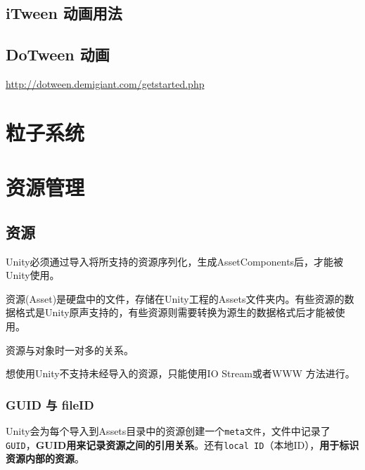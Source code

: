 \documentclass[UTF8,a4paper,12pt]{ctexbook}
\begin{document}
	\section{iTween 动画用法}
		
	
	\section{DoTween 动画}
		\url{http://dotween.demigiant.com/getstarted.php}
	
	
	
\chapter{粒子系统}

		

				
				
\chapter{资源管理}
	\section{资源}
		Unity必须通过导入将所支持的资源序列化，生成AssetComponents后，才能被Unity使用。
		
		资源(Asset)是硬盘中的文件，存储在Unity工程的Assets文件夹内。有些资源的数据格式是Unity原声支持的，有些资源则需要转换为源生的数据格式后才能被使用。
	
		资源与对象时一对多的关系。
		
		想使用Unity不支持未经导入的资源，只能使用IO Stream或者WWW 方法进行。
	
		\subsection{GUID 与 fileID}
			Unity会为每个导入到Assets目录中的资源创建一个\verb|meta文件|，文件中记录了\verb|GUID|，\textbf{GUID用来记录资源之间的引用关系}。还有\verb|local ID|（本地ID），\textbf{用于标识资源内部的资源}。
			
\end{document}
